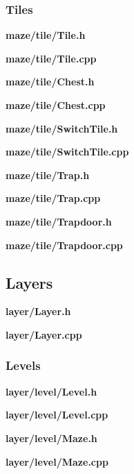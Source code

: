\documentclass[../Main.tex]{subfiles}
\begin{document}
        \subsubsection{Tiles}
            \textbf{maze/tile/Tile.h}
            
            \textbf{maze/tile/Tile.cpp}
            

            \textbf{maze/tile/Chest.h}
            
            \textbf{maze/tile/Chest.cpp}
            

            \textbf{maze/tile/SwitchTile.h}
            
            \textbf{maze/tile/SwitchTile.cpp}
            

            \textbf{maze/tile/Trap.h}
            
            \textbf{maze/tile/Trap.cpp}
            

            \textbf{maze/tile/Trapdoor.h}
            
            \textbf{maze/tile/Trapdoor.cpp}
            

    \subsection{Layers}
        \textbf{layer/Layer.h}
        
        \textbf{layer/Layer.cpp}
        

        \subsubsection{Levels}
            \textbf{layer/level/Level.h}
            
            \textbf{layer/level/Level.cpp}
            

            \textbf{layer/level/Maze.h}
            
            \textbf{layer/level/Maze.cpp}
            
\end{document}
